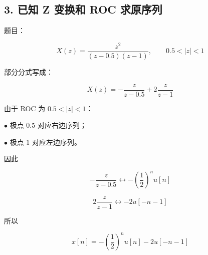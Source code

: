 \documentclass[11pt]{ctexart}
\begin{document}
\subsection*{3. 已知 Z 变换和 ROC 求原序列}



题目：\par



\[

X(z)=\frac{z^2}{(z-0.5)(z-1)},\qquad 0.5<|z|<1

\]



部分分式写成：\par



\[

X(z)=

-\frac{z}{z-0.5}

+2\frac{z}{z-1}

\]



由于 ROC 为 \(0.5<|z|<1\)：\par



\noindent\(\bullet\) 极点 \(0.5\) 对应右边序列；\par

\noindent\(\bullet\) 极点 \(1\) 对应左边序列。\par



因此\par



\[

-\frac{z}{z-0.5}

\longleftrightarrow

-\left(\frac12\right)^n u[n]

\]



\[

2\frac{z}{z-1}

\longleftrightarrow

-2u[-n-1]

\]



所以\par



\[

x[n]=

-\left(\frac12\right)^n u[n]

-2u[-n-1]

\]
\end{document}
